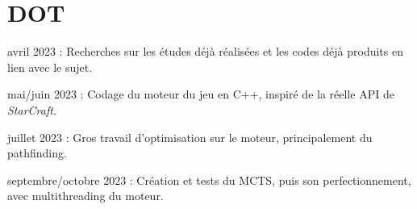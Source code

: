 \documentclass[a4paper, 11pt]{article}
\begin{document}


\section*{DOT}
\begin{enumerate}[{[1]}]
    \item avril 2023 : Recherches sur les études déjà réalisées et les codes déjà produits en lien avec le sujet.
    \item mai/juin 2023 : Codage du moteur du jeu en C++, inspiré de la réelle API de \emph{StarCraft}.
    \item juillet 2023 : Gros travail d'optimisation sur le moteur, principalement du pathfinding.
    \item septembre/octobre 2023 : Création et tests du MCTS, puis son perfectionnement, avec multithreading du moteur.
\end{enumerate}
\end{document}
